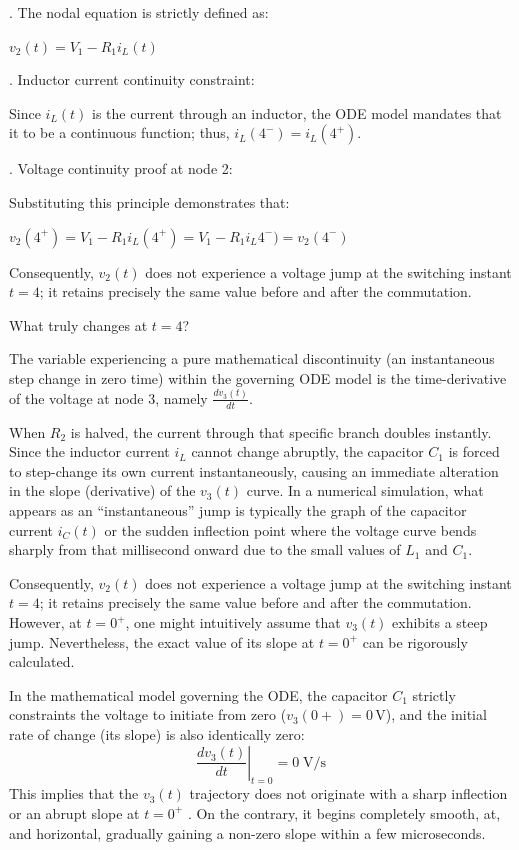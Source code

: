 \documentclass[energies,accept,oneauthor,pdftex]{Definitions/mdpi}
\begin{document}
\medskip{}. The nodal equation is strictly defined as: \\
\centerline{\(v_2 (t) = V_1 - R_1  i_L (t) \)}

\medskip{}. Inductor current continuity constraint:

Since $i_L (t)$ is the current through an inductor, the ODE model mandates that it to be a continuous function; thus, $i_L (4^-) = i_L (4^+)$.

\medskip{}. Voltage continuity proof at node 2:

Substituting this principle demonstrates that:\\
\centerline{${v_2(4^+) = V_1 - R_1  i_L(4^+) = V_1 - R_1 i_L 4^-) = v_2 (4^-)}$}

Consequently, $v_2 (t)$ does not experience a voltage jump at the switching instant $t = 4$; it retains precisely the same value before and after the commutation.

What truly changes at $t = 4$?

The variable experiencing a pure mathematical discontinuity (an instantaneous step change in zero time) within the governing ODE model is the time-derivative of the voltage at node 3, namely $\frac{dv_3(t)}{dt}$.

When $R_2$ is halved, the current through that specific branch doubles instantly. Since the inductor current $i_L$ cannot change abruptly, the capacitor $C_1$ is forced to step-change its own current instantaneously, causing an immediate alteration in the slope (derivative) of the $v_3(t)$ curve. In a numerical simulation, what appears as an ``instantaneous'' jump is typically the graph of the capacitor current $i_C (t)$ or the sudden inflection point where the voltage curve bends sharply from that millisecond onward due to the small values of $L_1$ and $C_1$.


Consequently, $v_2(t)$ does not experience a voltage jump at the switching instant $t = 4$; it retains precisely the same value before and after the commutation. However, at $t = 0^+$, one might intuitively assume that $v_3(t)$ exhibits a steep jump. Nevertheless, the exact value of its slope at $t = 0^+$ can be rigorously calculated.

In the mathematical model governing the ODE, the capacitor $C_1$ strictly constraints the voltage to initiate from zero ($v_3 (0+ ) = 0$\,V), and the initial rate of change (its slope)
is also identically zero:
\[
\left.\frac{dv_3 (t)}{dt}\right|_{t=0} = 0\; \mathrm{V/s}
\]
This implies that the $v_3(t)$ trajectory does not originate with a sharp inflection or an abrupt slope at $t = 0^+$ . On the contrary, it begins completely smooth, at, and horizontal, gradually gaining a non-zero slope within a few microseconds.
\end{document}
